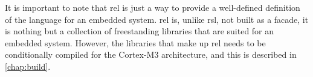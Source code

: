 It is important to note that \gls{rel} is just a way to provide a well-defined definition of the {\rust} language for an embedded system.
\gls{rel} is, unlike \gls{rsl}, not built as a facade, it is nothing but a collection of freestanding {\rust} libraries that are suited for an embedded system.
However, the libraries that make up \gls{rel} needs to be conditionally compiled for the Cortex-M3 architecture, and this is described in \autoref{chap:build}.
